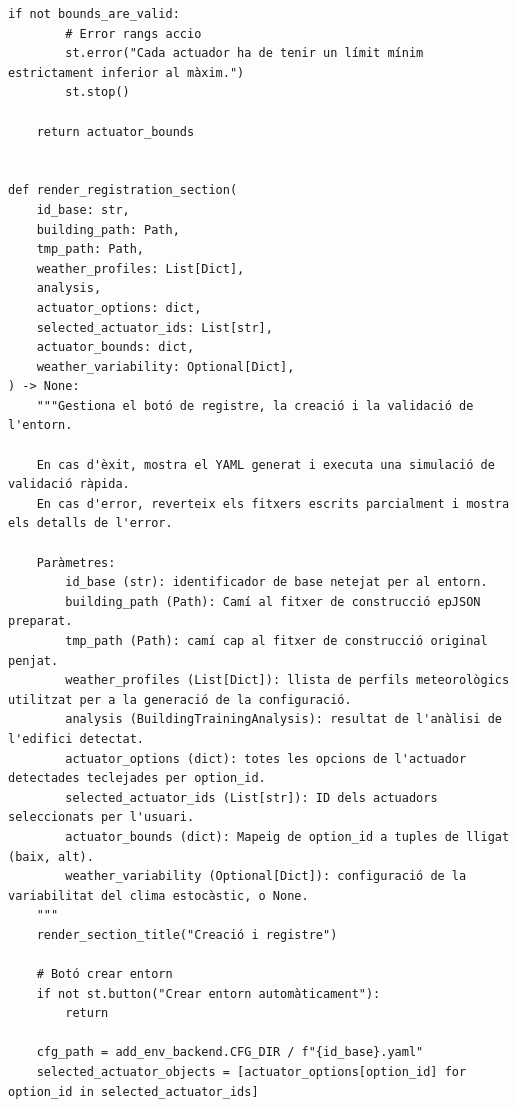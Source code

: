 \documentclass[10pt,a4paper]{article}
\begin{document}
\begin{lstlisting}[style=studioPython,caption={pages/Afegir\_Entorn.py},label={lst:pages-afegir-entorn-py}]
    if not bounds_are_valid:
        # Error rangs accio
        st.error("Cada actuador ha de tenir un límit mínim estrictament inferior al màxim.")
        st.stop()

    return actuator_bounds


def render_registration_section(
    id_base: str,
    building_path: Path,
    tmp_path: Path,
    weather_profiles: List[Dict],
    analysis,
    actuator_options: dict,
    selected_actuator_ids: List[str],
    actuator_bounds: dict,
    weather_variability: Optional[Dict],
) -> None:
    """Gestiona el botó de registre, la creació i la validació de l'entorn.

    En cas d'èxit, mostra el YAML generat i executa una simulació de validació ràpida.
    En cas d'error, reverteix els fitxers escrits parcialment i mostra els detalls de l'error.

    Paràmetres:
        id_base (str): identificador de base netejat per al entorn.
        building_path (Path): Camí al fitxer de construcció epJSON preparat.
        tmp_path (Path): camí cap al fitxer de construcció original penjat.
        weather_profiles (List[Dict]): llista de perfils meteorològics utilitzat per a la generació de la configuració.
        analysis (BuildingTrainingAnalysis): resultat de l'anàlisi de l'edifici detectat.
        actuator_options (dict): totes les opcions de l'actuador detectades teclejades per option_id.
        selected_actuator_ids (List[str]): ID dels actuadors seleccionats per l'usuari.
        actuator_bounds (dict): Mapeig de option_id a tuples de lligat (baix, alt).
        weather_variability (Optional[Dict]): configuració de la variabilitat del clima estocàstic, o None.
    """
    render_section_title("Creació i registre")

    # Botó crear entorn
    if not st.button("Crear entorn automàticament"):
        return

    cfg_path = add_env_backend.CFG_DIR / f"{id_base}.yaml"
    selected_actuator_objects = [actuator_options[option_id] for option_id in selected_actuator_ids]


\end{lstlisting}
\end{document}
